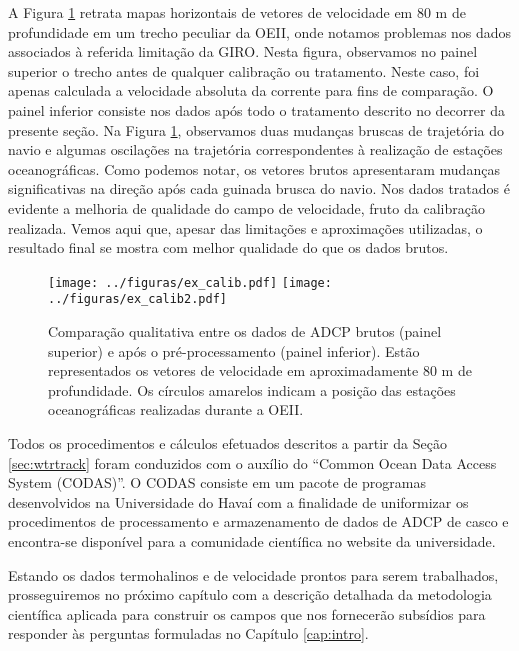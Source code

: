 A Figura \ref{fig:ex_calib} retrata mapas horizontais de vetores de velocidade em 80 m de profundidade em
um trecho peculiar da OEII, onde notamos problemas nos dados associados à referida limitação da
GIRO. Nesta figura, observamos no painel superior o trecho antes de qualquer calibração ou tratamento. Neste caso, foi 
apenas calculada a velocidade absoluta da corrente para fins de comparação. O painel inferior consiste nos dados após
todo o tratamento descrito no decorrer da presente seção. Na Figura \ref{fig:ex_calib}, observamos duas mudanças 
bruscas de trajetória do navio e algumas 
oscilações na trajetória correspondentes à realização de estações oceanográficas. Como podemos notar, os vetores brutos
apresentaram mudanças significativas na direção após cada guinada brusca do navio. Nos dados tratados é evidente 
a melhoria de qualidade do campo de velocidade,
fruto da calibração realizada. Vemos aqui que, apesar das limitações e aproximações utilizadas,
o resultado final se mostra com melhor qualidade do que os dados brutos. 

\begin{figure}
 \begin{center}
  \texttt{[image: ../figuras/ex\_calib.pdf]}
  \texttt{[image: ../figuras/ex\_calib2.pdf]}
 \end{center}
 \vspace{-.25cm}
 \renewcommand{\baselinestretch}{1}
 \caption{\label{fig:ex_calib} \small Comparação qualitativa entre os dados de ADCP brutos (painel superior)
 e após o pré-processamento (painel inferior).
Estão representados os vetores de velocidade em aproximadamente 80 m de profundidade. 
Os círculos amarelos indicam a posição das estações oceanográficas realizadas durante a OEII.}
\end{figure}

Todos os procedimentos e cálculos efetuados descritos a partir da Seção \ref{sec:wtrtrack} foram conduzidos com o 
auxílio do ``Common Ocean Data Access System (CODAS)''. O CODAS consiste em um pacote de programas desenvolvidos na 
Universidade do Havaí com a finalidade de uniformizar os procedimentos de processamento e armazenamento de dados 
de ADCP de casco e encontra-se disponível para a comunidade científica no website da universidade.

Estando os dados termohalinos e de velocidade prontos para serem trabalhados, prosseguiremos no próximo capítulo
com a descrição detalhada da metodologia ci\-en\-tí\-fi\-ca aplicada para construir os campos que nos fornecerão 
subsídios para responder às perguntas formuladas no Capítulo \ref{cap:intro}.


